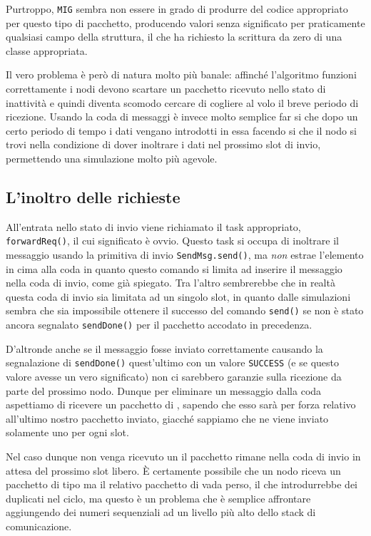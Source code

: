\documentclass[twoside,11pt,a4paper,italian,openany]{book}
\begin{document}
Purtroppo, \texttt{MIG} sembra non essere in grado di produrre del codice appropriato per questo tipo di pacchetto, producendo valori senza significato per praticamente qualsiasi 
campo della struttura, il che ha richiesto la scrittura da zero di una classe appropriata. 
 

Il vero problema è però di natura molto più banale: affinché l'algoritmo funzioni correttamente 
i nodi devono scartare un pacchetto ricevuto nello stato di inattività e quindi diventa scomodo
cercare di cogliere al volo il breve periodo di ricezione. 
Usando la coda di messaggi è invece molto semplice far si che dopo un certo periodo di tempo 
i dati vengano introdotti in essa facendo si che il nodo si trovi nella condizione di dover 
inoltrare i dati nel prossimo slot di invio, permettendo una simulazione molto più agevole. 


\subsection{L'inoltro delle richieste}
All'entrata nello stato di invio viene richiamato il task appropriato, 
\texttt{forwardReq()}, il cui significato è ovvio.
Questo task si occupa di inoltrare il messaggio usando la primitiva di invio 
\texttt{SendMsg.send()},
ma \emph{non} estrae l'elemento in cima alla coda in quanto questo comando si limita 
ad inserire il messaggio  nella coda di invio, come già spiegato. 
Tra l'altro sembrerebbe che in realtà questa coda di invio sia limitata ad un singolo slot, 
in quanto dalle simulazioni sembra che sia impossibile ottenere il successo del comando 
\texttt{send()} se non è stato ancora segnalato \texttt{sendDone()} per il pacchetto accodato
in precedenza. 


D'altronde anche se il messaggio fosse inviato correttamente causando la segnalazione di 
\texttt{sendDone()} quest'ultimo con un valore \texttt{SUCCESS} (e se questo valore avesse 
un vero significato) non ci sarebbero garanzie sulla ricezione da parte del prossimo nodo. 
Dunque per eliminare un messaggio dalla coda aspettiamo di ricevere 
un pacchetto di \ack, sapendo che esso sarà per forza relativo all'ultimo nostro pacchetto 
inviato, giacché sappiamo che ne viene inviato solamente uno per ogni slot. 

Nel caso dunque non venga ricevuto un \ack il pacchetto rimane nella coda di invio in attesa 
del prossimo slot libero. \`E certamente possibile che un nodo riceva un pacchetto di tipo \req 
ma il relativo pacchetto di \ack vada perso, il che introdurrebbe dei duplicati nel ciclo, 
ma questo è un problema che è semplice affrontare aggiungendo dei numeri sequenziali ad un 
livello più alto dello stack di comunicazione. 
\end{document}
